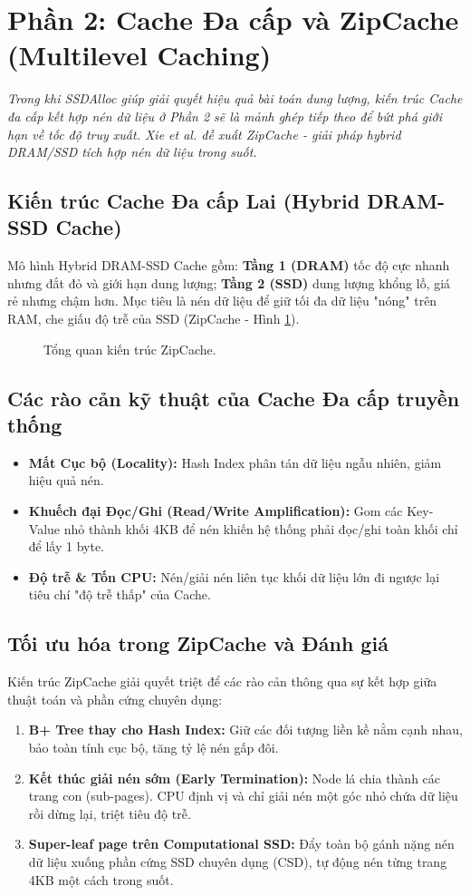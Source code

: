 \documentclass[10pt,twocolumn,a4paper]{article}
\begin{document}
\section{Phần 2: Cache Đa cấp và ZipCache (Multilevel Caching)}
\textit{Trong khi SSDAlloc giúp giải quyết hiệu quả bài toán dung lượng, kiến trúc Cache đa cấp kết hợp nén dữ liệu ở Phần 2 sẽ là mảnh ghép tiếp theo để bứt phá giới hạn về tốc độ truy xuất. Xie et al. \cite{xie2024zipcache} đề xuất ZipCache - giải pháp hybrid DRAM/SSD tích hợp nén dữ liệu trong suốt.}

\subsection{Kiến trúc Cache Đa cấp Lai (Hybrid DRAM-SSD Cache)}
Mô hình Hybrid DRAM-SSD Cache gồm: \textbf{Tầng 1 (DRAM)} tốc độ cực nhanh nhưng đắt đỏ và giới hạn dung lượng; \textbf{Tầng 2 (SSD)} dung lượng khổng lồ, giá rẻ nhưng chậm hơn. Mục tiêu là nén dữ liệu để giữ tối đa dữ liệu "nóng" trên RAM, che giấu độ trễ của SSD (ZipCache - Hình \ref{fig:zipcache_overview}).

\begin{figure}[htbp]
    \centering
    \caption{Tổng quan kiến trúc ZipCache.}
    \label{fig:zipcache_overview}
\end{figure}

\subsection{Các rào cản kỹ thuật của Cache Đa cấp truyền thống}
\begin{itemize}
    \item \textbf{Mất Cục bộ (Locality):} Hash Index phân tán dữ liệu ngẫu nhiên, giảm hiệu quả nén.
    \item \textbf{Khuếch đại Đọc/Ghi (Read/Write Amplification):} Gom các Key-Value nhỏ thành khối 4KB để nén khiến hệ thống phải đọc/ghi toàn khối chỉ để lấy 1 byte.
    \item \textbf{Độ trễ \& Tốn CPU:} Nén/giải nén liên tục khối dữ liệu lớn đi ngược lại tiêu chí "độ trễ thấp" của Cache.
\end{itemize}

\subsection{Tối ưu hóa trong ZipCache và Đánh giá}
Kiến trúc ZipCache giải quyết triệt để các rào cản thông qua sự kết hợp giữa thuật toán và phần cứng chuyên dụng:
\begin{enumerate}
    \item \textbf{B+ Tree thay cho Hash Index:} Giữ các đối tượng liền kề nằm cạnh nhau, bảo toàn tính cục bộ, tăng tỷ lệ nén gấp đôi.
    \item \textbf{Kết thúc giải nén sớm (Early Termination):} Node lá chia thành các trang con (sub-pages). CPU định vị và chỉ giải nén một góc nhỏ chứa dữ liệu rồi dừng lại, triệt tiêu độ trễ.
    \item \textbf{Super-leaf page trên Computational SSD:} Đẩy toàn bộ gánh nặng nén dữ liệu xuống phần cứng SSD chuyên dụng (CSD), tự động nén từng trang 4KB một cách trong suốt.
\end{enumerate}
\end{document}
